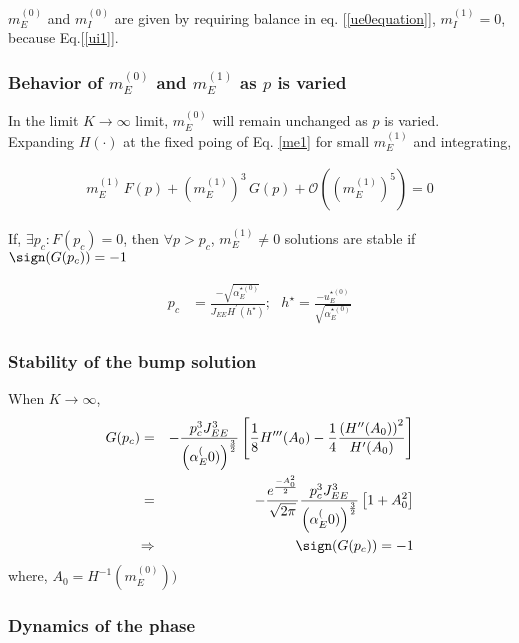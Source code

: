 $m_E^{(0)}$ and $m_I^{(0)}$ are given by requiring balance in eq. [\ref{ue0equation}], $m_I^{(1)} = 0$, because Eq.[\ref{ui1}]. \\

\subsubsection{Behavior of $m_E^{(0)}$ and $m_E^{(1)}$ as $p$ is varied}
In the limit $K \rightarrow \infty$ limit, $m_E^{(0)}$ will remain unchanged as $p$ is varied.\\

Expanding $H(\cdot)$ at the fixed poing of Eq. \ref{me1} for small $m_E^{(1)}$ and integrating,


\begin{eqnarray}
m_E^{(1)} \, F(p) + \left( m_E^{(1)} \right)^3 \,  G(p) + \mathcal{O} \left(\left( m_E^{(1)} \right)^5 \right) = 0
\end{eqnarray}

If, $\exists p_c: F(p_{c}) = 0$, then $\forall p>p_c$, $m_E^{(1)} \neq 0$ solutions are stable if $\sign (G(p_c)) = -1 $  

\begin{eqnarray}
p_{c} &= \frac{ - \sqrt{\alpha_E^{\star (0)}}}{J_{EE} H^{\prime}(h^{\star})}; \,\,\,\, h^{\star} = \frac{- u_E^{\star (0)}}{\sqrt{\alpha_E^{\star (0)}}} 
\end{eqnarray}

\subsubsection{Stability of the bump solution}
When $K \rightarrow \infty$, 
\begin{eqnarray}
G(p_c)  =&& -\frac{p^3_c J_{EE}^{3}}{\left( \alpha_E^(0) \right)^{\frac{3}{2}}} \left[ \frac{1}{8} H^{\prime \prime \prime} (A_0) - \frac{1}{4} \frac{\left( H^{\prime \prime} (A_0)\right)^2 }{H^{\prime}(A_0)} \right] \\
=&& - \frac{e^{\frac{-A^2_0}{2}}}{\sqrt{2 \pi}} \frac{p^3_c J_{EE}^{3}}{\left( \alpha_E^(0) \right)^{\frac{3}{2}}}  \left[1 + A^2_0 \right] \\
\Rightarrow&& \sign(G(p_c)) = -1
\end{eqnarray}
where, $A_{0} = H^{-1}(m_E^{(0)}))$

\subsubsection{Dynamics of the phase}


